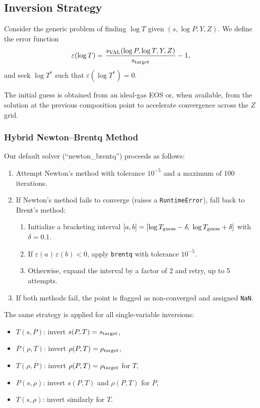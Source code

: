 \documentclass[twocolumn]{aastex701}
\begin{document}
\subsection{Inversion Strategy}\label{sec:inv_strategy}

Consider the generic problem of finding $\log T$ given $(s, \log P, Y, Z)$.
We define the error function
\begin{equation}\label{eq:err_sp}
    \varepsilon(\log T) = \frac{s_{\rm VAL}(\log P, \log T, Y, Z)}{s_{\rm target}} - 1,
\end{equation}
and seek $\log T^*$ such that $\varepsilon(\log T^*) = 0$.

The initial guess is obtained from an ideal-gas EOS or, when available, from the solution at the previous composition point to accelerate convergence across the $Z$ grid.

\subsubsection{Hybrid Newton--Brentq Method}

Our default solver (``newton\_brentq'') proceeds as follows:
\begin{enumerate}
    \item Attempt Newton's method with tolerance $10^{-5}$ and a maximum of 100 iterations.
    \item If Newton's method fails to converge (raises a \texttt{RuntimeError}), fall back to Brent's method:
    \begin{enumerate}
        \item Initialize a bracketing interval $[a,b] = [\log T_{\rm guess} - \delta,\;\log T_{\rm guess} + \delta]$ with $\delta = 0.1$.
        \item If $\varepsilon(a)\,\varepsilon(b) < 0$, apply \texttt{brentq} with tolerance $10^{-5}$.
        \item Otherwise, expand the interval by a factor of 2 and retry, up to 5 attempts.
    \end{enumerate}
    \item If both methods fail, the point is flagged as non-converged and assigned \texttt{NaN}.
\end{enumerate}

The same strategy is applied for all single-variable inversions:
\begin{itemize}
    \item $T(s, P)$: invert $s(P,T) = s_{\rm target}$,
    \item $P(\rho, T)$: invert $\rho(P,T) = \rho_{\rm target}$,
    \item $T(\rho, P)$: invert $\rho(P,T) = \rho_{\rm target}$ for $T$,
    \item $P(s, \rho)$: invert $s(P,T)$ and $\rho(P,T)$ for $P$,
    \item $T(s, \rho)$: invert similarly for $T$.
\end{itemize}
\end{document}

